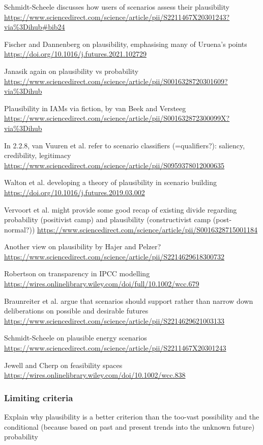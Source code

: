 \documentclass{article}
\begin{document}
\begin{refsection}
Schmidt-Scheele discusses how users of scenarios assess their plausibility \url{https://www.sciencedirect.com/science/article/pii/S2211467X20301243?via%3Dihub#bib24}

Fischer and Dannenberg on plausibility, emphasising many of Uruena's points \url{https://doi.org/10.1016/j.futures.2021.102729}

Janasik again on plausibility vs probability \url{https://www.sciencedirect.com/science/article/pii/S0016328720301609?via%3Dihub}

Plausibility in IAMs via fiction, by van Beek and Versteeg \url{https://www.sciencedirect.com/science/article/pii/S001632872300099X?via%3Dihub}

In 2.2.8, van Vuuren et al. refer to scenario classifiers (=qualifiers?): saliency, credibility, legitimacy \url{https://www.sciencedirect.com/science/article/pii/S0959378012000635}

Walton et al. developing a theory of plausibility in scenario building \url{https://doi.org/10.1016/j.futures.2019.03.002}

Vervoort et al. might provide some good recap of existing divide regarding probability (positivist camp) and plausibility (constructivist camp (post-normal?)) \url{https://www.sciencedirect.com/science/article/pii/S0016328715001184}

Another view on plausibility by Hajer and Pelzer? \url{https://www.sciencedirect.com/science/article/pii/S2214629618300732}

Robertson on transparency in IPCC modelling \url{https://wires.onlinelibrary.wiley.com/doi/full/10.1002/wcc.679}

Braunreiter et al. argue that scenarios should support rather than narrow down deliberations on possible and desirable futures \url{https://www.sciencedirect.com/science/article/pii/S2214629621003133}

Schmidt-Scheele on plausible energy scenarios \url{https://www.sciencedirect.com/science/article/pii/S2211467X20301243}

Jewell and Cherp on feasibility spaces \url{https://wires.onlinelibrary.wiley.com/doi/10.1002/wcc.838}

\subsubsection{Limiting criteria}
Explain why plausibility is a better criterion than the too-vast possibility and the conditional (because based on past and present trends into the unknown future) probability


\end{refsection}
\end{document}
